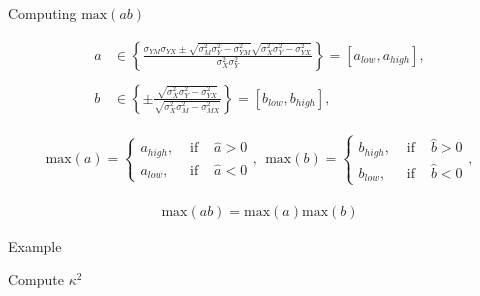 \documentclass{beamer}
\begin{document}
\begin{frame}{Computing $\text{max}(ab)$}
  
  \begin{align*}
    a &\in \left\{ 
    \frac{
      \sigma_{YM} \sigma_{YX} \pm 
      \sqrt{ \sigma_M^2 \sigma_Y^2 - \sigma_{YM}^2 }
      \sqrt{ \sigma_X^2 \sigma_Y^2 - \sigma_{YX}^2 } 
    }{ 
      \sigma_X^2 \sigma_Y^2 
    }
    \right\} 
    = [a_{low}, a_{high}],
    \\
    \\
    b &\in \left\{
    \pm \frac{
      \sqrt{ \sigma_X^2 \sigma_Y^2 - \sigma_{YX}^2 }
    }{
      \sqrt{ \sigma_X^2 \sigma_M^2 - \sigma_{MX}^2 }
    }
    \right\} = [b_{low}, b_{high}],
  \end{align*}
  
  \begin{align*}
    \text{max}(a) = \left\{ \begin{array}{lll}
      a_{high}, & \text{ if } & \hat{a} > 0\\
      a_{low}, & \text{ if } & \hat{a} < 0
    \end{array}
    \right.,~~
    \text{max}(b) = \left\{ \begin{array}{lll}
      b_{high}, & \text{ if } & \hat{b} > 0\\
      b_{low}, & \text{ if } & \hat{b} < 0
    \end{array}
    \right.,
  \end{align*}
  
  \begin{align*}
    \text{max}(ab) = \text{max}(a) \text{max}(b)
  \end{align*}
  
\end{frame}


\begin{frame}[allowframebreaks]{Example}
    


\pagebreak



\pagebreak



\pagebreak



\end{frame}


\begin{frame}[allowframebreaks]{Compute $\kappa^2$}



\pagebreak



\end{frame}
\end{document}

